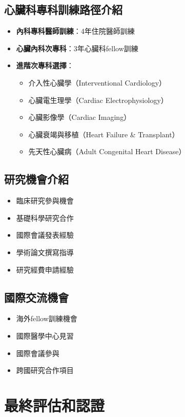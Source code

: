 \documentclass[12pt,a4paper]{article}
\begin{document}
\subsection{心臟科專科訓練路徑介紹}
\begin{itemize}[nosep]
    \item \textbf{內科專科醫師訓練}：4年住院醫師訓練
    \item \textbf{心臟內科次專科}：3年心臟科fellow訓練
    \item \textbf{進階次專科選擇}：
    \begin{itemize}[nosep]
        \item 介入性心臟學（Interventional Cardiology）
        \item 心臟電生理學（Cardiac Electrophysiology）
        \item 心臟影像學（Cardiac Imaging）
        \item 心臟衰竭與移植（Heart Failure \& Transplant）
        \item 先天性心臟病（Adult Congenital Heart Disease）
    \end{itemize}
\end{itemize}

\subsection{研究機會介紹}
\begin{itemize}[nosep]
    \item 臨床研究參與機會
    \item 基礎科學研究合作
    \item 國際會議發表經驗
    \item 學術論文撰寫指導
    \item 研究經費申請經驗
\end{itemize}

\subsection{國際交流機會}
\begin{itemize}[nosep]
    \item 海外fellow訓練機會
    \item 國際醫學中心見習
    \item 國際會議參與
    \item 跨國研究合作項目
\end{itemize}

\section{最終評估和認證}
\end{document}
